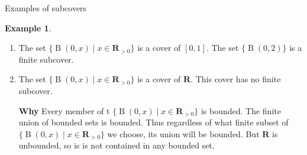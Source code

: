 \documentclass[fleqn]{beamer}
\newcommand{\reals}{\mathbf{R}}
\DeclareMathOperator{\ball}{B}
\theoremstyle{definition}
\newtheorem{myex}{Example}
\begin{document}
\begin{frame}{Examples of subcovers}

\begin{myex}

\begin{enumerate}  


\item The set \(\{ \ball(0,x) \mid x \in \reals_{>0}\} \) is a cover of \([0,1]\).      The set \(\{ \ball(0,2)  \} \) is a finite subcover. 

\item  The set \(\{ \ball(0,x) \mid x \in \reals_{>0}\} \) is a cover of \( \reals\).  This cover has no finite subcover. 

\textbf{Why} Every member of t \(\{ \ball(0,x) \mid x \in \reals_{>0}\} \) is bounded. The finite union of bounded sets is bounded. Thus regardless of what finite subset of \(\{ \ball(0,x) \mid x \in \reals_{>0}\} \) we choose,
its union will be bounded.  But \(\reals\) is unbounded, so is is not contained in any bounded set.
\end{enumerate}
\end{myex}

\end{frame}
\end{document}
